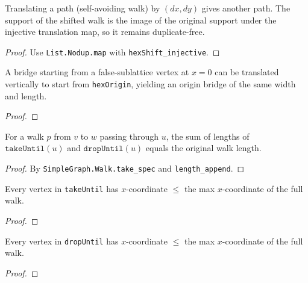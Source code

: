 \begin{lemma}\label{lem:shift_walk_path}
\leanok
{}
  Translating a path (self-avoiding walk) by $(dx, dy)$ gives another path.
  The support of the shifted walk is the image of the original support
  under the injective translation map, so it remains duplicate-free.
\end{lemma}
\begin{proof}
\leanok
{}
  Use \texttt{List.Nodup.map} with \texttt{hexShift\_injective}.
\end{proof}

\begin{lemma}\label{lem:bridge_to_origin}
\leanok
{}
  A bridge starting from a false-sublattice vertex at $x = 0$ can be
  translated vertically to start from \texttt{hexOrigin}, yielding an
  origin bridge of the same width and length.
\end{lemma}
\begin{proof}
\leanok
{}
\end{proof}

\begin{lemma}\label{lem:path_split_length}
\leanok
  For a walk $p$ from $v$ to $w$ passing through $u$, the sum of
  lengths of $\texttt{takeUntil}(u)$ and $\texttt{dropUntil}(u)$
  equals the original walk length.
\end{lemma}
\begin{proof}
\leanok
  By \texttt{SimpleGraph.Walk.take\_spec} and \texttt{length\_append}.
\end{proof}

\begin{lemma}\label{lem:takeUntil_x_bound}
\leanok
{}
  Every vertex in \texttt{takeUntil} has $x$-coordinate $\leq$ the max
  $x$-coordinate of the full walk.
\end{lemma}
\begin{proof}
\leanok
{}
\end{proof}

\begin{lemma}\label{lem:dropUntil_x_bound}
\leanok
{}
  Every vertex in \texttt{dropUntil} has $x$-coordinate $\leq$ the max
  $x$-coordinate of the full walk.
\end{lemma}
\begin{proof}
\leanok
{}
\end{proof}

